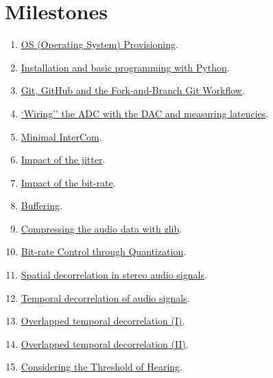 \section{Milestones}
\begin{enumerate}
\item \href{https://tecnologias-multimedia.github.io/study_guide/01-provisioning/}{OS (Operating System) Provisioning}.
\item \href{https://tecnologias-multimedia.github.io/study_guide/02-python/}{Installation and basic programming with Python}.
\item \href{https://tecnologias-multimedia.github.io/study_guide/03-git/}{Git, GitHub and the Fork-and-Branch Git Workflow}.
\item \href{https://tecnologias-multimedia.github.io/study_guide/04-wiring/}{`Wiring'' the ADC with the DAC and measuring latencies}.
\item \href{https://tecnologias-multimedia.github.io/study_guide/05-minimal/}{Minimal InterCom}.
\item \href{https://tecnologias-multimedia.github.io/study_guide/06-jitter_impact/}{Impact of the jitter}.
\item \href{https://tecnologias-multimedia.github.io/study_guide/07-bit-rate_impact/}{Impact of the bit-rate}.
\item \href{https://tecnologias-multimedia.github.io/study_guide/08-buffering/}{Buffering}.
\item \href{https://tecnologias-multimedia.github.io/study_guide/09-compress/}{Compressing the audio data with zlib}.
\item \href{https://tecnologias-multimedia.github.io/study_guide/10-quantization/}{Bit-rate Control through Quantization}.
\item \href{https://tecnologias-multimedia.github.io/study_guide/11-stereo_coding/}{Spatial decorrelation in stereo audio signals}.
\item \href{https://tecnologias-multimedia.github.io/study_guide/12-temporal_decorrelation/}{Temporal decorrelation of audio signals}.
\item \href{https://tecnologias-multimedia.github.io/study_guide/13-overlapped_temporal_decorrelation/}{Overlapped temporal decorrelation (I)}.
\item \href{https://tecnologias-multimedia.github.io/study_guide/14-overlapped_temporal_decorrelation/}{Overlapped temporal decorrelation (II)}.
\item \href{https://tecnologias-multimedia.github.io/study_guide/15-threshold/}{Considering the Threshold of Hearing}.
\end{enumerate}


